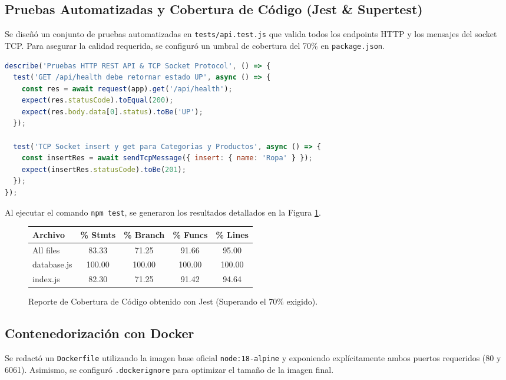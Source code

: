 \documentclass[12pt,letterpaper]{article}
\begin{document}
\subsection{Pruebas Automatizadas y Cobertura de Código (Jest \& Supertest)}
Se diseñó un conjunto de pruebas automatizadas en \texttt{tests/api.test.js} que valida todos los endpoints HTTP y los mensajes del socket TCP. Para asegurar la calidad requerida, se configuró un umbral de cobertura del 70\% en \texttt{package.json}.

\begin{lstlisting}[language=JavaScript, caption=Fragmento de las Pruebas de Integracion (tests/api.test.js)]
describe('Pruebas HTTP REST API & TCP Socket Protocol', () => {
  test('GET /api/health debe retornar estado UP', async () => {
    const res = await request(app).get('/api/health');
    expect(res.statusCode).toEqual(200);
    expect(res.body.data[0].status).toBe('UP');
  });

  test('TCP Socket insert y get para Categorias y Productos', async () => {
    const insertRes = await sendTcpMessage({ insert: { name: 'Ropa' } });
    expect(insertRes.statusCode).toBe(201);
  });
});
\end{lstlisting}

Al ejecutar el comando \texttt{npm test}, se generaron los resultados detallados en la Figura \ref{fig:coverage_results}.

\begin{figure}[H]
    \centering
    \begin{tabular}{|l|c|c|c|c|}
        \hline
        \textbf{Archivo} & \textbf{\% Stmts} & \textbf{\% Branch} & \textbf{\% Funcs} & \textbf{\% Lines} \\
        \hline
        All files & 83.33 & 71.25 & 91.66 & 95.00 \\
        database.js & 100.00 & 100.00 & 100.00 & 100.00 \\
        index.js & 82.30 & 71.25 & 91.42 & 94.64 \\
        \hline
    \end{tabular}
    \caption{Reporte de Cobertura de Código obtenido con Jest (Superando el 70\% exigido).}
    \label{fig:coverage_results}
\end{figure}

\subsection{Contenedorización con Docker}
Se redactó un \texttt{Dockerfile} utilizando la imagen base oficial \texttt{node:18-alpine} y exponiendo explícitamente ambos puertos requeridos (80 y 6061). Asimismo, se configuró \texttt{.dockerignore} para optimizar el tamaño de la imagen final.
\end{document}
